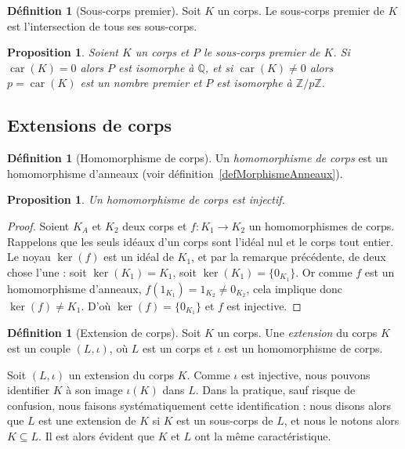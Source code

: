 \documentclass[a4paper, titlepage]{article}
\newtheorem{prop}[theo]{Proposition}
\theoremstyle{definition}
\newtheorem{defi}[theo]{Définition}
\theoremstyle{remark}
\def\Z{\mathbb Z}
\def\Q{\mathbb Q}
\def\car{\operatorname{car}}
\begin{document}
\begin{defi}[Sous-corps premier]
Soit $K$ un corps. Le sous-corps premier de $K$ est l'intersection de tous ses sous-corps.
\end{defi}

\begin{prop}
Soient $K$ un corps et $P$ le sous-corps premier de $K$. Si $\car(K) = 0$ alors $P$ est isomorphe à $\Q$, et si $\car(K) \neq 0$ alors $p = \car(K)$ est un nombre premier et $P$ est isomorphe à $\Z/p\Z$.
\end{prop}

\subsection{Extensions de corps}

\begin{defi}[Homomorphisme de corps]
Un \textit{homomorphisme de corps} est un homomorphisme d'anneaux (voir définition~\ref{defMorphismeAnneaux}).
\end{defi}

\begin{prop}
Un homomorphisme de corps est injectif.
\end{prop}

\begin{proof}
Soient $K_A$ et $K_2$ deux corps et $f : K_1 \rightarrow K_2$ un homomorphismes de corps. Rappelons que les seuls idéaux d'un corps sont l'idéal nul et le corps tout entier. Le noyau $\ker(f)$ est un idéal de $K_1$, et par la remarque précédente, de deux chose l'une : soit $\ker(K_1) = K_1$, soit $\ker(K_1)=\{0_{K_1}\}$. Or comme $f$ est un homomorphisme d'anneaux, $f(1_{K_1}) = 1_{K_2} \neq 0_{K_2}$, cela implique donc $\ker(f) \neq K_1$. D'où $\ker(f) = \{0_{K_1}\}$ et $f$ est injective.
\end{proof}

\begin{defi}[Extension de corps]
Soit $K$ un corps. Une \textit{extension} du corps $K$ est un couple $(L, \iota)$, où $L$ est un corps et $\iota$ est un homomorphisme de corps.
\end{defi}

Soit $(L, \iota)$ un extension du corps $K$. Comme $\iota$ est injective, nous pouvons identifier $K$ à son image $\iota(K)$ dans $L$. Dans la pratique, sauf risque de confusion, nous faisons systématiquement cette identification : nous disons alors que $L$ est une extension de $K$ si $K$ est un sous-corps de $L$, et nous le notons alors $K\subseteq L$. Il est alors évident que $K$ et $L$ ont la même caractéristique.
\end{document}
